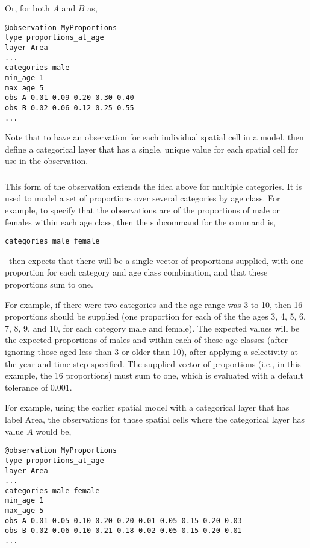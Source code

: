 Or, for both $A$ and $B$ as,

{\small{\begin{verbatim}
@observation MyProportions
type proportions_at_age
layer Area
...
categories male
min_age 1
max_age 5
obs A 0.01 0.09 0.20 0.30 0.40
obs B 0.02 0.06 0.12 0.25 0.55
...
\end{verbatim}

Note that to have an observation for each individual spatial cell in a model, then define a categorical layer that has a single, unique value for each spatial cell for use in the observation. 

\subsubsection*{}

This form of the observation extends the idea above for multiple categories. It is used to model a set of proportions over several categories by age class. For example, to specify that the observations are of the proportions of male or females within each age class, then the subcommand  for the  command is,

{\small{\begin{verbatim}
categories male female
\end{verbatim}}}

\iSAM\ then expects that there will be a single vector of proportions supplied, with one proportion for each category and age class combination, and that these proportions sum to one. 

For example, if there were two categories and the age range was 3 to 10, then 16 proportions should be supplied (one proportion for each of the the ages 3, 4, 5, 6, 7, 8, 9, and 10, for each category male and female). The expected values will be the expected proportions of males and within each of these age classes (after ignoring those aged less than 3 or older than 10), after applying a selectivity at the year and time-step specified. The supplied vector of proportions (i.e., in this example, the 16 proportions) must sum to one, which is evaluated with a default tolerance of 0.001. 

For example, using the earlier spatial model with a categorical layer that has label Area, the observations for those spatial cells where the categorical layer has value $A$ would be, 

{\small{\begin{verbatim}
@observation MyProportions
type proportions_at_age
layer Area
...
categories male female
min_age 1
max_age 5
obs A 0.01 0.05 0.10 0.20 0.20 0.01 0.05 0.15 0.20 0.03
obs B 0.02 0.06 0.10 0.21 0.18 0.02 0.05 0.15 0.20 0.01
...
\end{verbatim}

}}}}
